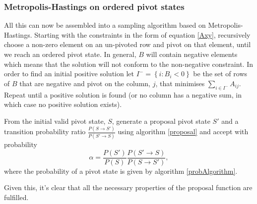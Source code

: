 \subsubsection{Metropolis-Hastings on ordered pivot states}

All this can now be assembled into a sampling algorithm based on Metropolis-Hastings. Starting with the constraints in the form of equation \ref{Axy}, recursively choose a non-zero element on an un-pivoted row and pivot on that element, until we reach an ordered pivot state. In general, $B$ will contain negative elements which means that the solution will not conform to the non-negative constraint. In order to find an initial positive solution let $I^- = \left\{i: B_i < 0\right\}$ be the set of rows of $B$ that are negative and pivot on the column, $j$, that minimises $\sum_{i\in I^-}A_{ij}$. Repeat until a positive solution is found (or no column has a negative sum, in which case no positive solution exists).

From the initial valid pivot state, $S$, generate a proposal pivot state $S'$ and a transition probability ratio $\frac{P(S\rightarrow S')}{P(S' \rightarrow S)}$ using algorithm \ref{proposal} and accept with probability
\[
\alpha = \frac{P(S')}{P(S)}\frac{P(S'\rightarrow S)}{P(S \rightarrow S')},
\]
where the probability of a pivot state is given by algorithm \ref{probAlgorithm}.

Given this, it's clear that all the necessary properties of the proposal function are fulfilled.

